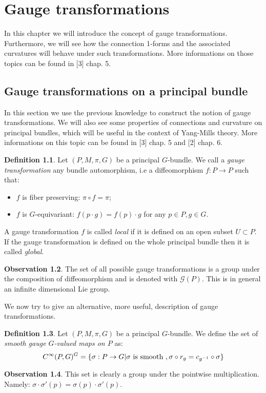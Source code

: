 \documentclass[12pt,a4paper]{report}
\theoremstyle{definition}
\newtheorem{Def}{Definition}[chapter]
\theoremstyle{Theorem}
\theoremstyle{definition}
\theoremstyle{definition}
\newtheorem{Obs}[Def]{Observation}
\begin{document}
	\chapter{Gauge transformations}
	In this chapter we will introduce the concept of gauge transformations. Furthermore, we will see how the connection 1-forms and the associated curvatures will behave under such transformations. More informations on those topics can be found in [3] chap. 5.
	\section{Gauge transformations on a principal bundle}
	In this section we use the previous knowledge to construct the notion of gauge transformations. We will also see some properties of connections and curvature on principal bundles, which will be useful in the context of Yang-Mills theory. More informations on this topic can be found in [3] chap. 5 and [2] chap. 6.
	\begin{Def}
		Let $(P,M,\pi,G)$ be a principal $G$-bundle. We call a \textit{gauge transformation} any bundle automorphism, i.e a diffeomorphism $f:P\rightarrow P$ such that:
		\begin{itemize}
			\item $f$ is fiber preserving: $\pi\circ f=\pi$;
			\item $f$ is $G$-equivariant: $f(p\cdot g)=f(p)\cdot g$ for any $p\in P, g\in G$.
		\end{itemize}
		A gauge transformation $f$ is called \textit{local} if it is defined on an open subset $U\subset P$. If the gauge transformation is defined on the whole principal bundle then it is called \textit{global}.
	\end{Def}
	\begin{Obs}
		The set of all possible gauge transformations is a group under the composition of diffeomorphism and is denoted with $\mathcal{G}(P)$. This is in general an infinite dimensional Lie group.
	\end{Obs}
	We now try to give an alternative, more useful, description of gauge transformations.
	\begin{Def}
		Let $(P,M,\pi,G)$ be a principal $G$-bundle. We define the set of \textit{smooth gauge $G$-valued maps on $P$} as:
		$$C^\infty(P,G)^G=\{\sigma:P\rightarrow G|\sigma\hbox{ is smooth },\sigma\circ r_g=c_{g^{-1}}\circ \sigma\}$$
	\end{Def}
	\begin{Obs}
		This set is clearly a group under the pointwise multiplication. Namely:
		$\sigma\cdot \sigma'(p)=\sigma(p)\cdot \sigma'(p)$.
	\end{Obs}
\end{document}
